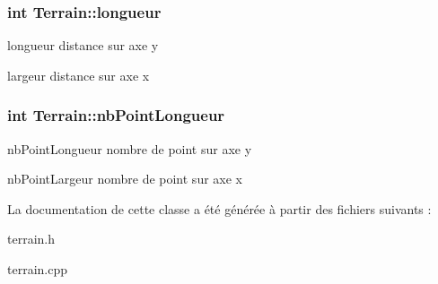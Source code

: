 \subsubsection[{longueur}]{\setlength{\rightskip}{0pt plus 5cm}int Terrain\+::longueur\hspace{0.3cm}{\ttfamily [protected]}}\label{class_terrain_afb6ae76bf574629e089f086eaf18036a}


longueur distance sur axe y 

largeur distance sur axe x \hypertarget{class_terrain_a7a4093259732066a936d06873a498f08}{}
\subsubsection[{nb\+Point\+Longueur}]{\setlength{\rightskip}{0pt plus 5cm}int Terrain\+::nb\+Point\+Longueur\hspace{0.3cm}{\ttfamily [protected]}}\label{class_terrain_a7a4093259732066a936d06873a498f08}


nb\+Point\+Longueur nombre de point sur axe y 

nb\+Point\+Largeur nombre de point sur axe x 

La documentation de cette classe a été générée à partir des fichiers suivants \+:\begin{DoxyCompactItemize}
\item 
terrain.\+h\item 
terrain.\+cpp\end{DoxyCompactItemize}
